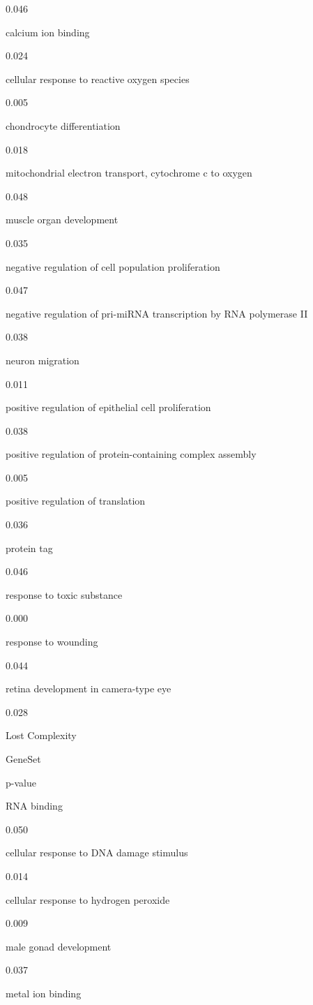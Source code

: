 \documentclass[
  letterpaper,
  DIV=11,
  numbers=noendperiod,
  openany,
  oneside]{scrreprt}
\begin{document}
0.046

calcium ion binding

0.024

cellular response to reactive oxygen species

0.005

chondrocyte differentiation

0.018

mitochondrial electron transport, cytochrome c to oxygen

0.048

muscle organ development

0.035

negative regulation of cell population proliferation

0.047

negative regulation of pri-miRNA transcription by RNA polymerase II

0.038

neuron migration

0.011

positive regulation of epithelial cell proliferation

0.038

positive regulation of protein-containing complex assembly

0.005

positive regulation of translation

0.036

protein tag

0.046

response to toxic substance

0.000

response to wounding

0.044

retina development in camera-type eye

0.028

Lost Complexity

GeneSet

p-value

RNA binding

0.050

cellular response to DNA damage stimulus

0.014

cellular response to hydrogen peroxide

0.009

male gonad development

0.037

metal ion binding
\end{document}
